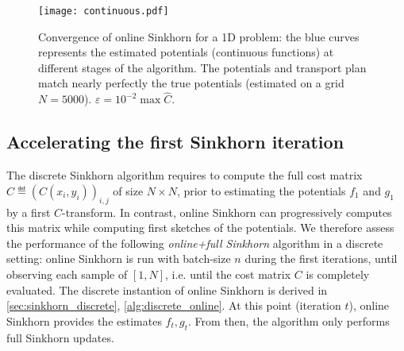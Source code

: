     


\begin{figure*}[t]
    \centering
    \if{}
    \begin{widepage}
    \fi
    \texttt{[image: continuous.pdf]}
    \caption{Convergence of online Sinkhorn for a 1D problem: the blue curves represents the estimated potentials (continuous functions) at different stages of the algorithm. The potentials and transport plan match nearly perfectly the true potentials (estimated on a grid $N = 5000$). $\varepsilon = 10^{-2} \max \hat C$.
    \label{fig:potentials}
    }
    \if{}
    \end{widepage}
    \fi
\end{figure*}

\subsection{Accelerating the first Sinkhorn iteration}\label{sec:accelerating}

The discrete Sinkhorn algorithm requires to compute the full cost matrix $\hat C \eqdef
(C(x_i,y_i))_{i,j}$  of size $N \times N$, prior to estimating the
potentials $f_1$ and $g_1$ by a first $C$-transform. In contrast, online Sinkhorn can progressively
computes this matrix while computing first sketches of the potentials. We therefore
assess the performance of the following \textit{online+full Sinkhorn} algorithm
in a discrete setting: online Sinkhorn is run with batch-size $n$ during the first iterations, until
observing each sample of $[1,N]$, i.e. until the cost matrix $C$ is completely evaluated. The discrete instantion of online Sinkhorn is derived in \autoref{sec:sinkhorn_discrete}, \autoref{alg:discrete_online}. 
At this point (iteration $t$), online Sinkhorn provides the estimates $f_{t},
g_{t}$. From then, the algorithm only performs full Sinkhorn updates.


